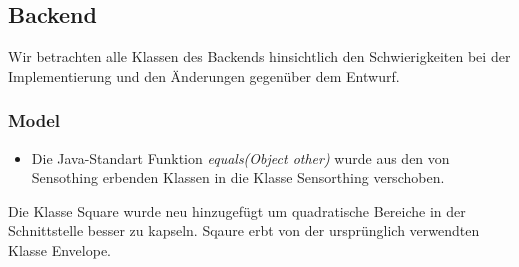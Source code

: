 \subsection{Backend}
Wir betrachten alle Klassen des Backends hinsichtlich den Schwierigkeiten bei der Implementierung und den Änderungen gegenüber dem Entwurf.

\subsubsection{Model}
\noChange
{}
\noChange
{}
\noChange
{}
\noChange
{}
\changedFunctions
\begin{itemize}[noitemsep]
    \item Die Java-Standart Funktion \textit{equals(Object other)} wurde aus den von Sensothing erbenden Klassen in die Klasse Sensorthing verschoben.
\end{itemize}
\noChange
{}
\noChange
{}
\noChange
{}
\noChange
{}
Die Klasse Square wurde neu hinzugefügt um quadratische Bereiche in der Schnittstelle besser zu kapseln. Sqaure erbt von der ursprünglich verwendten Klasse Envelope.

